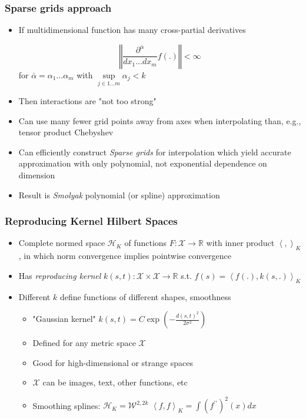 \documentclass[bigger]{beamer}
\begin{document}
\begin{frame}%

\frametitle{Sparse grids approach}


\begin{itemize}

\item If multidimensional function has many cross-partial derivatives

\begin{equation*}
\left\Vert\frac{\partial^{\bar{\alpha}}}{dx_1\ldots dx_m}f(.)\right\Vert<\infty
\end{equation*}
for $\bar{\alpha}=\alpha_1\ldots\alpha_m$ with $\underset{j\in 1\ldots m}{\sup}\alpha_j<k$

\item Then interactions are "not too strong"
\item Can use many fewer grid points away from axes when interpolating than, e.g., tensor product Chebyshev
\item Can efficiently construct \emph{Sparse grids} for interpolation which yield accurate approximation with only polynomial, not exponential dependence on dimension
\item Result is \emph{Smolyak} polynomial (or spline) approximation

\end{itemize}


\end{frame}%


\begin{frame}%

\frametitle{Reproducing Kernel Hilbert Spaces}


\begin{itemize}

\item Complete normed space $\mathcal{H}_K$ of functions $F:\mathcal{X}\to\mathbb{R}$ with inner product $\left\langle,\right\rangle_K$, in which norm convergence implies pointwise convergence
\item Has \emph{reproducing kernel} $k(s,t):\mathcal{X}\times\mathcal{X}\to\mathbb{R}$ s.t. $f(s)=\left\langle f(.),k(s,.)\right\rangle_K$
\item Different $k$ define functions of different shapes, smoothness 
\begin{itemize}
\item "Gaussian kernel" $k(s,t)=C\exp(-\frac{d(s,t)^2}{2\sigma^2})$
\item Defined for any metric space $\mathcal{X}$
\item Good for high-dimensional or strange spaces 
\item $\mathcal{X}$ can be images, text, other functions, etc
\item Smoothing splines: $\mathcal{H}_K=\mathcal{W}^{2,2k}$ $\left\langle f,f\right\rangle_K=\int (f^{\prime\prime})^{2}(x)dx$
\end{itemize}



\end{itemize}


\end{frame}%
\end{document}
